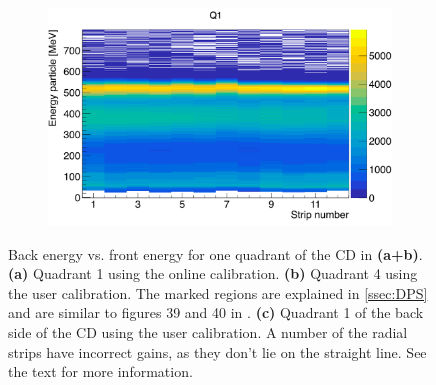 \documentclass[twoside,english]{uiofysmaster/uiofysmaster}
\let\orgautoref\autoref
\renewcommand{\autoref}
        {%
		 \def\sectionautorefname{Section}%
		 \def\subsectionautorefname{Section}%
		 \def\subsubsectionautorefname{Section}%
		 \def\chapterautorefname{Chapter}%
          \orgautoref}
\begin{document}
\begin{figure}[htb!]
\begin{subfigure}[t]{0.49\textwidth}
		\includegraphics[width=\textwidth]{../Plots/plotting/E_vs_b-strip_Q1.png}
		\caption{}
		\label{fig:CD_cal_back}
	\end{subfigure}
	\caption{Back energy vs. front energy for one quadrant of the CD in \textbf{(a+b)}. 
	\textbf{(a)} Quadrant 1 using the online calibration.
	\textbf{(b)} Quadrant 4 using the user calibration. The marked regions are explained in \autoref{ssec:DPS} and are similar to figures 39 and 40 in \cite{Rosiak}.
	\textbf{(c)} Quadrant 1 of the back side of the CD using the user calibration. A number of the radial strips have incorrect gains, as they don't lie on the straight line.
	See the text for more information.}
	\label{fig:FBE}
\end{figure}


\end{document}
